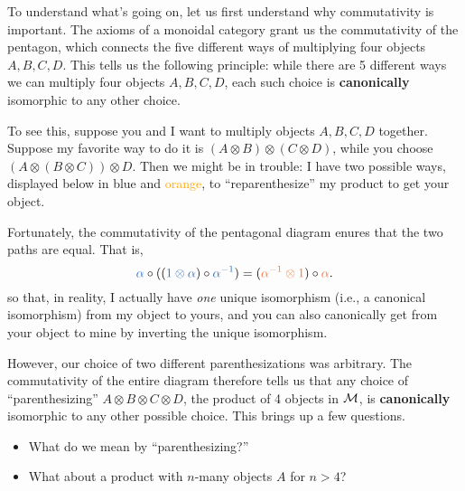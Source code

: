 To understand what's going on, let us  first understand why commutativity is important. 
The axioms of a monoidal category grant us the commutativity of the pentagon, which 
connects the five different ways of multiplying four objects $A,B,C,D$. 
This tells us the following principle: while there are 5 different ways we can multiply four objects 
$A,B,C,D$, each such choice is \textbf{canonically} isomorphic to any other choice. 

To see this, suppose you and I want to multiply objects $A,B,C,D$ together.  Suppose 
my favorite way to do it is $(A\otimes B)\otimes(C \otimes D)$, 
while you choose $(A\otimes(B\otimes C))\otimes D$. Then we might be in trouble: 
I have two possible ways, displayed below in \textcolor{NavyBlue}{blue} 
and \textcolor{Orange}{orange}, to ``reparenthesize'' my product to get your object. 
\begin{center}
\end{center}
Fortunately, the commutativity of the pentagonal diagram enures that 
the two paths are equal. That is, 
\[
    \textcolor{NavyBlue}{\alpha}\circ ((\textcolor{NavyBlue}{1\otimes \alpha})\circ \textcolor{NavyBlue}{\alpha^{-1}})
    =
    (\textcolor{Orange}{\alpha^{-1}\otimes 1})\circ \textcolor{Orange}{\alpha}.
\] 
so that, in reality, I actually have \emph{one} unique isomorphism (i.e., a canonical isomorphism)
from my object to yours, and you can also canonically get from your object to mine by inverting 
the unique isomorphism. 

However, our choice of two different parenthesizations was arbitrary. The 
commutativity of the entire diagram therefore tells us 
that any choice of ``parenthesizing'' $A \otimes B \otimes C \otimes D$, the 
product of 4 objects in $\mathcal{M}$, is \textbf{canonically} isomorphic 
to any other possible choice. This brings up a few questions. 
\begin{itemize}
    \item What do we mean by ``parenthesizing?''
    \item What about a product with $n$-many objects $A$ for $n > 4$?
\end{itemize}

